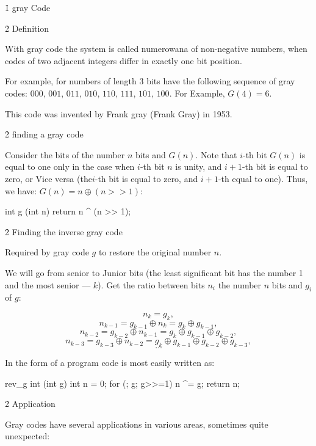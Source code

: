 \h1{ gray Code }


\h2{ Definition }

With gray code the system is called numerowana of non-negative numbers, when codes of two adjacent integers differ in exactly one bit position.

For example, for numbers of length 3 bits have the following sequence of gray codes: $000$, $001$, $011$, $010$, $110$, $111$, $101$, $100$. For Example, $G(4)=6$.

This code was invented by Frank gray (Frank Gray) in 1953.


\h2{ finding a gray code }

Consider the bits of the number $n$ bits and $G(n)$. Note that $i$-th bit $G(n)$ is equal to one only in the case when $i$-th bit $n$ is unity, and $i+1$-th bit is equal to zero, or Vice versa (the$i$-th bit is equal to zero, and $i+1$-th equal to one). Thus, we have: $G(n) = n \oplus (n>>1)$:

\code
int g (int n) {
return n ^ (n >> 1);
}
\endcode


\h2{ Finding the inverse gray code }

Required by gray code $g$ to restore the original number $n$.

We will go from senior to Junior bits (the least significant bit has the number 1 and the most senior --- $k$). Get the ratio between bits $n_i$ the number $n$ bits and $g_i$ of $g$:

$$ n_k = g_k, $$
$$ n_{k-1} = g_{k-1} \oplus n_k = g_k \oplus g_{k-1}, $$
$$ n_{k-2} = g_{k-2} \oplus n_{k-1} = g_k \oplus g_{k-1} \oplus g_{k-2}, $$
$$ n_{k-3} = g_{k-3} \oplus n_{k-2} = g_k \oplus g_{k-1} \oplus g_{k-2} \oplus g_{k-3}, $$
$$ \ldots $$

In the form of a program code is most easily written as:

\code
rev_g int (int g) {
int n = 0;
for (; g; g>>=1)
n ^= g;
return n;
}
\endcode


\h2{ Application }

Gray codes have several applications in various areas, sometimes quite unexpected:

